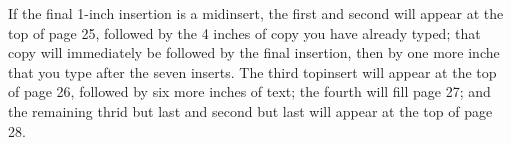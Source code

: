 If the final 1-inch insertion is a midinsert, the first and second 
will appear at the top of page 25, followed by the
4 inches of copy you have already typed;
that copy will immediately be followed by the final insertion, then by one
more inche that you type after the seven inserts.
The third topinsert will appear at
the top of page 26, followed by six more inches of text; the fourth will fill page 27; and
the remaining thrid but last and second but last will appear at the top of page 28.

\bye


